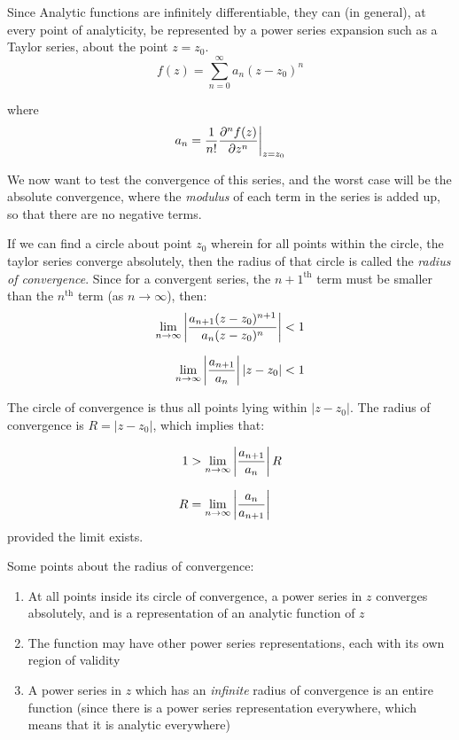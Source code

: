\documentclass[12pt, letterpaper]{book}
\begin{document}
Since Analytic functions are infinitely differentiable, they can (in general), at every point of analyticity, be represented by a power series expansion such as a Taylor series, about the point $z= z_0$. 
$$f(z)= \sum_{n=0}^{\infty} a_n (z-z_0)^n $$

where $$a_n= \frac{1}{n!}\pdv[n]{f(z)}{z}\bigg|_{z=z_0} $$

We now want to test the convergence of this series, and the worst case will be the absolute convergence, where the \emph{modulus} of each term in the series is added up, so that there are no negative terms. 

If we can find a circle about point $z_0$ wherein for all points within the circle, the taylor series converge absolutely, then the radius of that circle is called the \emph{radius of convergence}. Since for a convergent series, the ${n+1}^{\text{th}}$ term must be smaller than the ${n}^{\text{th}}$ term (as $n\to\infty$), then: 
\[ \setlength{\jot}{10pt}
    \begin{aligned}
    \lim_{n\to\infty} \left|\frac{a_{n+1}(z-z_0)^{n+1}}{a_n(z-z_0)^n}\right|&<1\\
    \lim_{n\to\infty} \left|\frac{a_{n+1}}{a_n}\right|\left|z-z_0\right|&<1
\end{aligned}\]

The circle of convergence is thus all points lying within $|z-z_0|$. The radius of convergence is $R= |z-z_0|$, which implies that: 

\[ \setlength{\jot}{10pt}
    \begin{aligned}
    1&>\lim_{n\to\infty} \left|\frac{a_{n+1}}{a_n}\right|R\\
    R&= \lim_{n\to\infty} \left|\frac{a_{n}}{a_{n+1}}\right|
\end{aligned}\]
provided the limit exists. 

Some points about the radius of convergence: 

\begin{enumerate}
    \item At all points inside its circle of convergence, a power series in $z$ converges absolutely, and is a representation of an analytic function of $z$
    \item The function may have other power series representations, each with its own region of validity
    \item A power series in $z$ which has an \emph{infinite} radius of convergence is an entire function (since there is a power series representation everywhere, which means that it is analytic everywhere)
\end{enumerate}
\end{document}
